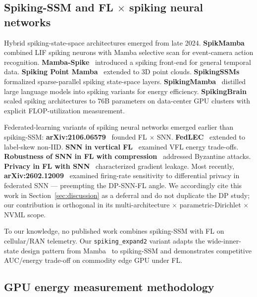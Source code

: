 \documentclass[journal]{IEEEtran}
\begin{document}
\subsection{Spiking-SSM and FL $\times$ spiking neural networks}

Hybrid spiking-state-space architectures emerged from late 2024. \textbf{SpikMamba}~\cite{Chen2024_SpikMamba} combined LIF spiking neurons with Mamba selective scan for event-camera action recognition. \textbf{Mamba-Spike}~\cite{arXiv2408_11823_MambaSpike} introduced a spiking front-end for general temporal data. \textbf{Spiking Point Mamba}~\cite{SpikingPointMamba2025} extended to 3D point clouds. \textbf{SpikingSSMs}~\cite{SpikingSSMs2025} formalized sparse-parallel spiking state-space layers. \textbf{SpikingMamba}~\cite{arXiv2510_04595_SpikingMamba} distilled large language models into spiking variants for energy efficiency. \textbf{SpikingBrain}~\cite{arXiv2509_05276_SpikingBrain} scaled spiking architectures to 76B parameters on data-center GPU clusters with explicit FLOP-utilization measurement.

Federated-learning variants of spiking neural networks emerged earlier than spiking-SSM: \textbf{arXiv:2106.06579}~\cite{arXiv2106_06579_FLSNN} founded FL $\times$ SNN. \textbf{FedLEC}~\cite{arXiv2412_17305_FedLEC} extended to label-skew non-IID. \textbf{SNN in vertical FL}~\cite{arXiv2407_17672_VFL_SNN} examined VFL energy trade-offs. \textbf{Robustness of SNN in FL with compression}~\cite{arXiv2501_03306_RobustSNNFL} addressed Byzantine attacks. \textbf{Privacy in FL with SNN}~\cite{arXiv2511_21181_PrivSNNFL} characterized gradient leakage. Most recently, \textbf{arXiv:2602.12009}~\cite{arXiv2602_12009_DPSNNFL} examined firing-rate sensitivity to differential privacy in federated SNN --- preempting the DP-SNN-FL angle. We accordingly cite this work in Section~\ref{sec:discussion} as a deferral and do not duplicate the DP study; our contribution is orthogonal in its multi-architecture $\times$ parametric-Dirichlet $\times$ NVML scope.

To our knowledge, no published work combines spiking-SSM with FL on cellular/RAN telemetry. Our \lstinline|spiking_expand2| variant adapts the wide-inner-state design pattern from Mamba~\cite{GuDao2023_Mamba} to spiking-SSM and demonstrates competitive AUC/energy trade-off on commodity edge GPU under FL.

\subsection{GPU energy measurement methodology}\label{sec:related-energy}
\end{document}
